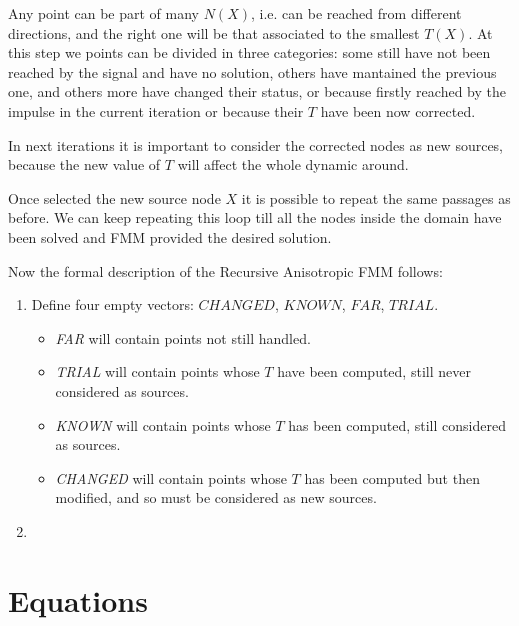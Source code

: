 \documentclass[11pt,a4paper]{article}
\begin{document}
    Any point can be part of many $N(X)$, i.e. can be reached from different directions, and the right one will be that associated to the smallest $T(X)$. At this step we points can be divided in three categories: some still have not been reached by the signal and have no solution, others have mantained the previous one, and others more have changed their status, or because firstly reached by the impulse in the current iteration or because their $T$ have been now corrected.
    
    In next iterations it is important to consider the corrected nodes as new sources,  because the new value of $T$ will affect the whole dynamic around. 
    
    Once selected the new source node $X$ it is possible to repeat the same passages as before. We can keep repeating this loop till all the nodes inside the domain have been solved and FMM provided the desired solution.


    Now the formal description of the Recursive Anisotropic FMM follows:

    \begin{enumerate}
        \item Define four empty vectors: $CHANGED$, $KNOWN$, $FAR$, $TRIAL$.

            \begin{itemize}
                \item \textit{FAR} will contain points not still handled.
                \item \textit{TRIAL} will contain points whose $T$ have been computed, still never considered as sources.
                \item \textit{KNOWN} will contain points whose $T$ has been computed, still considered as sources.
                \item \textit{CHANGED} will contain points whose $T$ has been computed but then modified, and so must be considered as new sources.
            \end{itemize}

        \item 
    \end{enumerate}

\section{Equations}
\end{document}
